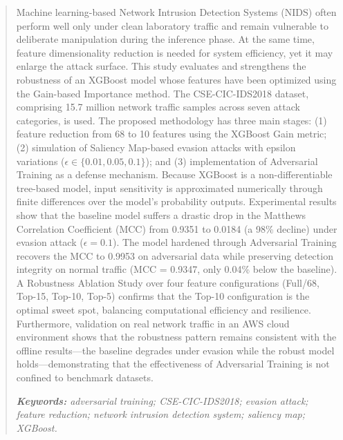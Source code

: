\documentclass[11pt, a4paper]{article}
\begin{document}
\begin{abstract}
\noindent Machine learning-based Network Intrusion Detection Systems (NIDS) often perform well only under clean laboratory traffic and remain vulnerable to deliberate manipulation during the inference phase. At the same time, feature dimensionality reduction is needed for system efficiency, yet it may enlarge the attack surface. This study evaluates and strengthens the robustness of an XGBoost model whose features have been optimized using the Gain-based Importance method. The CSE-CIC-IDS2018 dataset, comprising 15.7 million network traffic samples across seven attack categories, is used. The proposed methodology has three main stages: (1) feature reduction from 68 to 10 features using the XGBoost Gain metric; (2) simulation of Saliency Map-based evasion attacks with epsilon variations ($\epsilon \in \{0.01, 0.05, 0.1\}$); and (3) implementation of Adversarial Training as a defense mechanism. Because XGBoost is a non-differentiable tree-based model, input sensitivity is approximated numerically through finite differences over the model's probability outputs. Experimental results show that the baseline model suffers a drastic drop in the Matthews Correlation Coefficient (MCC) from 0.9351 to 0.0184 (a 98\% decline) under evasion attack ($\epsilon = 0.1$). The model hardened through Adversarial Training recovers the MCC to 0.9953 on adversarial data while preserving detection integrity on normal traffic (MCC = 0.9347, only 0.04\% below the baseline). A Robustness Ablation Study over four feature configurations (Full/68, Top-15, Top-10, Top-5) confirms that the Top-10 configuration is the optimal sweet spot, balancing computational efficiency and resilience. Furthermore, validation on real network traffic in an AWS cloud environment shows that the robustness pattern remains consistent with the offline results---the baseline degrades under evasion while the robust model holds---demonstrating that the effectiveness of Adversarial Training is not confined to benchmark datasets.

\vspace{0.3cm}
\noindent\textit{\textbf{Keywords:} adversarial training; CSE-CIC-IDS2018; evasion attack; feature reduction; network intrusion detection system; saliency map; XGBoost.}
\end{abstract}

\vspace{0.3cm}

\end{document}
